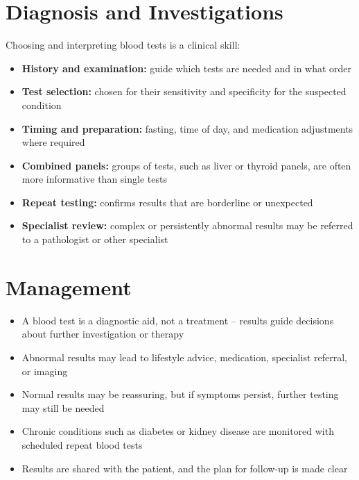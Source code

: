 \section*{Diagnosis and Investigations}
Choosing and interpreting blood tests is a clinical skill:

\begin{itemize}
    \item \textbf{History and examination:} guide which tests are needed and in what order
    \item \textbf{Test selection:} chosen for their sensitivity and specificity for the suspected condition
    \item \textbf{Timing and preparation:} fasting, time of day, and medication adjustments where required
    \item \textbf{Combined panels:} groups of tests, such as liver or thyroid panels, are often more informative than single tests
    \item \textbf{Repeat testing:} confirms results that are borderline or unexpected
    \item \textbf{Specialist review:} complex or persistently abnormal results may be referred to a pathologist or other specialist
\end{itemize}

\section*{Management}
\begin{itemize}
    \item A blood test is a diagnostic aid, not a treatment -- results guide decisions about further investigation or therapy
    \item Abnormal results may lead to lifestyle advice, medication, specialist referral, or imaging
    \item Normal results may be reassuring, but if symptoms persist, further testing may still be needed
    \item Chronic conditions such as diabetes or kidney disease are monitored with scheduled repeat blood tests
    \item Results are shared with the patient, and the plan for follow-up is made clear
\end{itemize}

